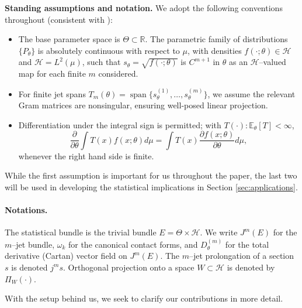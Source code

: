 \documentclass[3p,times]{elsarticle}
\begin{document}
\noindent\textbf{Standing assumptions and notation.}
We adopt the following conventions throughout (consistent with \cite{SRK}):
\begin{itemize}
  \item The base parameter space is $\Theta\subset\mathbb R$.  
 The parametric family of distributions $\{P_\theta\}$ is absolutely continuous with
  respect to $\mu$, with densities $f(\cdot;\theta)\in \mathcal{H}$ and $\mathcal{H}=L^2(\mu)$, such that  
  $s_\theta=\sqrt{f(\cdot;\theta)}$ is $C^{m+1}$ in $\theta$ as an $\mathcal{H}$--valued
  map for each finite $m$ considered.

  \item For finite jet spans  
  $T_m(\theta)=\operatorname{span}\{s_\theta^{(1)},\dots,s_\theta^{(m)}\}$,  
  we assume the relevant Gram matrices are nonsingular, ensuring well-posed
  linear projection.
  
  \item Differentiation under the integral sign is permitted; with \(T(\cdot): \mathbb E_\theta[T]<\infty\),
\[
\frac{\partial}{\partial\theta}\int T(x) f(x;\theta)d\mu=\int T(x)\frac{\partial f(x;\theta)}{\partial\theta} d\mu,
\] 
whenever the right hand side is finite.
\end{itemize}
While the first assumption is important for us throughout the paper, the last two will be used in developing the statistical implications in Section \ref{sec:applications}.
\paragraph{Notations.}The statistical bundle is the trivial bundle $E=\Theta\times \mathcal{H}$. We write $J^m(E)$ for the $m$--jet bundle, $\omega_k$ for the canonical
  contact forms, and $D_\theta^{(m)}$ for the total derivative (Cartan) vector
  field on $J^m(E)$.  The $m$--jet prolongation of a section $s$ is denoted
  $j^m s$. Orthogonal projection onto a space \(W\subset \mathcal{H}\) is denoted by \(\Pi_W(\cdot)\).

With the setup behind us, we seek to clarify our contributions in more detail. 
\end{document}
